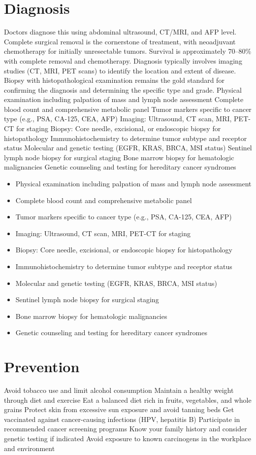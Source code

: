 \section{Diagnosis}
Doctors diagnose this using abdominal ultrasound, CT/MRI, and AFP level. Complete surgical removal is the cornerstone of treatment, with neoadjuvant chemotherapy for initially unresectable tumors. Survival is approximately 70--80\% with complete removal and chemotherapy. Diagnosis typically involves imaging studies (CT, MRI, PET scans) to identify the location and extent of disease. Biopsy with histopathological examination remains the gold standard for confirming the diagnosis and determining the specific type and grade. Physical examination including palpation of mass and lymph node assessment Complete blood count and comprehensive metabolic panel Tumor markers specific to cancer type (e.g., PSA, CA-125, CEA, AFP) Imaging: Ultrasound, CT scan, MRI, PET-CT for staging Biopsy: Core needle, excisional, or endoscopic biopsy for histopathology Immunohistochemistry to determine tumor subtype and receptor status Molecular and genetic testing (EGFR, KRAS, BRCA, MSI status) Sentinel lymph node biopsy for surgical staging Bone marrow biopsy for hematologic malignancies Genetic counseling and testing for hereditary cancer syndromes

\begin{itemize}[noitemsep]
  \item Physical examination including palpation of mass and lymph node assessment
  \item Complete blood count and comprehensive metabolic panel
  \item Tumor markers specific to cancer type (e.g., PSA, CA-125, CEA, AFP)
  \item Imaging: Ultrasound, CT scan, MRI, PET-CT for staging
  \item Biopsy: Core needle, excisional, or endoscopic biopsy for histopathology
  \item Immunohistochemistry to determine tumor subtype and receptor status
  \item Molecular and genetic testing (EGFR, KRAS, BRCA, MSI status)
  \item Sentinel lymph node biopsy for surgical staging
  \item Bone marrow biopsy for hematologic malignancies
  \item Genetic counseling and testing for hereditary cancer syndromes
\end{itemize}
\section{Prevention}
Avoid tobacco use and limit alcohol consumption Maintain a healthy weight through diet and exercise Eat a balanced diet rich in fruits, vegetables, and whole grains Protect skin from excessive sun exposure and avoid tanning beds Get vaccinated against cancer-causing infections (HPV, hepatitis B) Participate in recommended cancer screening programs Know your family history and consider genetic testing if indicated Avoid exposure to known carcinogens in the workplace and environment

